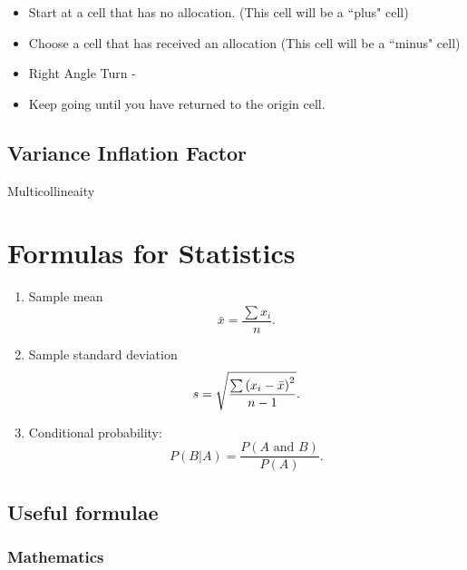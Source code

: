 \begin{itemize}
	\item Start at a cell that has no allocation. (This cell will be a ``plus" cell)
	\item Choose a cell that has received an allocation (This cell will be a ``minus" cell)
	\item Right Angle Turn -
	\item Keep going until you have returned to the origin cell.
\end{itemize}

\section{Variance Inflation Factor}

Multicollineaity

\chapter{Formulas for Statistics}

\begin{enumerate}
	\item Sample mean
	\begin{equation*}
	\bar{x}=\frac{\sum x_{i}}{n}.
	\end{equation*}
	
	\item Sample standard deviation
	\begin{equation*}
	s=\sqrt{\frac{\sum \left( x_{i}-\bar{x}\right) ^{2}}{%
			n-1}}.
	\end{equation*}
	
	\item Conditional probability:
	\begin{equation*}
	P(B|A)=\frac{P\left( A\text{ and }B\right) }{P\left( A\right) }.
	\end{equation*}
\end{enumerate}	

\section{Useful formulae}

\subsection{Mathematics}

